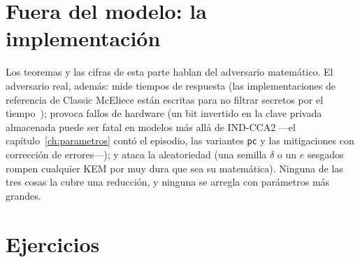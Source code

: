 \section{Fuera del modelo: la implementación}

\begin{practica}
Los teoremas y las cifras de esta parte hablan del adversario
matemático. El adversario real, además: mide tiempos de respuesta
(las implementaciones de referencia de Classic McEliece están
escritas para no filtrar secretos por el tiempo~\cite{cmimpl});
provoca fallos de hardware (un bit invertido en la clave privada
almacenada puede ser fatal en modelos más allá de IND-CCA2 ---el
capítulo~\ref{ch:parametros} contó el episodio, las variantes
\texttt{pc} y las mitigaciones con corrección de errores---); y
ataca la aleatoriedad (una semilla $\delta$ o un $e$ sesgados rompen
cualquier KEM por muy dura que sea su matemática). Ninguna de las
tres cosas la cubre una reducción, y ninguna se arregla con
parámetros más grandes.
\end{practica}

\section{Ejercicios}

